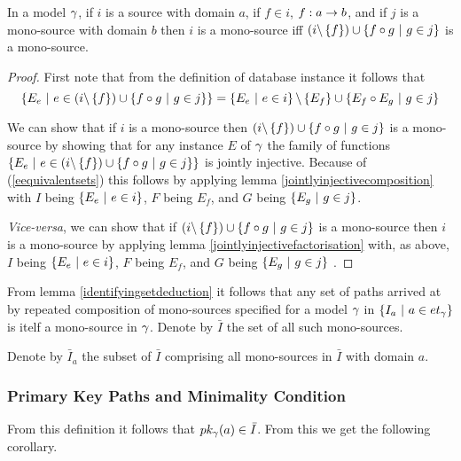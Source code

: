 \begin{lemma}
\label{identifyingsetdeduction}

In a model $\gamma$, if $i$ is a source with domain $a$,
if $f \in i$, $f: a \rightarrow b$, and if $j$ is a mono-source with domain $b$ then 
$i$ is a mono-source iff $(i \backslash \left\{f\right\}) \cup \left\{f \circ g \ \middle|\ g \in j\right\}$ is a mono-source.
\end{lemma}
\begin{proof}
First note that from the definition of database instance it follows that 
\begin{equation}
\label{eequivalentsets}
\left\{E_e \ \middle|\ e \in (i \backslash \left\{f\right\}) \cup \left\{f \circ g \ \middle|\ g \in j\right\}\right\}
= \left\{E_e \ \middle|\ e \in i\right\} \backslash \left\{E_f\right\} \cup \left\{E_f \circ E_g \ \middle|\ g \in j\right\}
\end{equation}

We can show that if $i$ is a mono-source 
then $(i \backslash \left\{f\right\}) \cup \left\{f \circ g \ \middle|\ g \in j\right\}$ is a mono-source
by showing that for any instance $E$ of $\gamma$ the family of functions 
$\left\{E_e \ \middle|\ e \in (i \backslash \left\{f\right\}) \cup \left\{f \circ g \ \middle|\ g \in j\right\}\right\}$
is jointly injective. Because of (\ref{eequivalentsets}) this follows by applying lemma \ref{jointlyinjectivecomposition} with $I$ being $\left\{E_e \ \middle|\ e \in i\right\}$,
$F$ being $E_f$,  and $G$ being $\left\{E_g \ \middle|\ g \in j\right\}$.

\textit{Vice-versa}, we can show that if $(i \backslash \left\{f\right\}) \cup \left\{f \circ g \ \middle|\ g \in j\right\}$ is a mono-source then $i$ is a mono-source by applying lemma \ref{jointlyinjectivefactorisation} 
with, as above, $I$ being $\left\{E_e \ \middle|\ e \in i\right\}$,
$F$ being $E_f$,  and $G$ being $\left\{E_g \ \middle|\ g \in j\right\}$ .
\end{proof}

From lemma \ref{identifyingsetdeduction} it follows that any set of paths arrived at by repeated composition of mono-sources specified for a model $\gamma$ in $\left\{I_a \ \middle|\ a \in et_{\gamma}\right\}$ is itelf a mono-source in $\gamma$. Denote by $\bar{I}$ the set  of all such mono-sources.

Denote by $\bar{I}_a$ the subset of $\bar{I}$ comprising all mono-sources in $\bar{I}$ with domain $a$.

\subsubsection{Primary Key Paths and Minimality Condition}
\label{minimalitycondition}
 From this definition it follows that $pk_{\gamma}(a) \in \bar{I}$. From this we get the following corollary.


